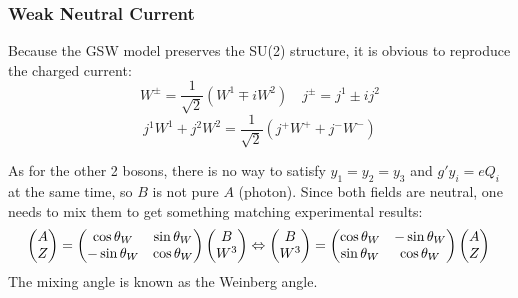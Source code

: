 \subsubsection{Weak Neutral Current}
Because the GSW model preserves the SU(2) structure, 
it is obvious to reproduce the charged current:
\begin{equation}
    W^\pm = \frac{1}{\sqrt{2}}(W^1 \mp iW^2)	\quad
    j^\pm = j^1 \pm ij^2
\end{equation}
\begin{equation}
    j^1W^1 + j^2W^2 = \frac{1}{\sqrt{2}}(j^+W^+ + j^-W^-)
\end{equation}

As for the other 2 bosons, there is no way to satisfy $y_1 = y_2 = y_3$ and 
$g'y_i = eQ_i$ at the same time, so $B$ is not pure $A$ (photon). 
Since both fields are neutral, one needs to mix them to
get something matching experimental results:
\begin{equation}
    \begin{pmatrix}
	A   \\
	Z   \\
    \end{pmatrix}
    =
    \begin{pmatrix}
	\cos\theta_W	& \sin\theta_W	\\
	-\sin\theta_W	& \cos\theta_W	\\
    \end{pmatrix}
    \begin{pmatrix}
	B   \\
	W^3 \\
    \end{pmatrix} 
    \Leftrightarrow
    \begin{pmatrix}
	B   \\
	W^3 \\
    \end{pmatrix}
    =
    \begin{pmatrix}
	\cos\theta_W	& -\sin\theta_W	\\
	\sin\theta_W	& \cos\theta_W	\\
    \end{pmatrix}
    \begin{pmatrix}
	A   \\
	Z	\\
    \end{pmatrix} \\
\end{equation}
The mixing angle is known as the Weinberg angle. 


